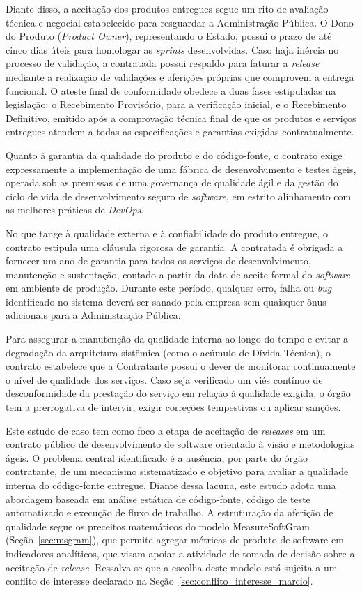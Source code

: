 Diante disso, a aceitação dos produtos entregues segue um rito de avaliação técnica e negocial estabelecido para resguardar a Administração Pública. O Dono do Produto (\textit{Product Owner}), representando o Estado, possui o prazo de até cinco dias úteis para homologar as \textit{sprints} desenvolvidas. Caso haja inércia no processo de validação, a contratada possui respaldo para faturar a \textit{release} mediante a realização de validações e aferições próprias que comprovem a entrega funcional. O ateste final de conformidade obedece a duas fases estipuladas na legislação: o Recebimento Provisório, para a verificação inicial, e o Recebimento Definitivo, emitido após a comprovação técnica final de que os produtos e serviços entregues atendem a todas as especificações e garantias exigidas contratualmente.

Quanto à garantia da qualidade do produto e do código-fonte, o contrato exige expressamente a implementação de uma fábrica de desenvolvimento e testes ágeis, operada sob as premissas de uma governança de qualidade ágil e da gestão do ciclo de vida de desenvolvimento seguro de \textit{software}, em estrito alinhamento com as melhores práticas de \textit{DevOps}.

No que tange à qualidade externa e à confiabilidade do produto entregue, o contrato estipula uma cláusula rigorosa de garantia. A contratada é obrigada a fornecer um ano de garantia para todos os serviços de desenvolvimento, manutenção e sustentação, contado a partir da data de aceite formal do \textit{software} em ambiente de produção. Durante este período, qualquer erro, falha ou \textit{bug} identificado no sistema deverá ser sanado pela empresa sem quaisquer ônus adicionais para a Administração Pública. 

Para assegurar a manutenção da qualidade interna ao longo do tempo e evitar a degradação da arquitetura sistêmica (como o acúmulo de Dívida Técnica), o contrato estabelece que a Contratante possui o dever de monitorar continuamente o nível de qualidade dos serviços. Caso seja verificado um viés contínuo de desconformidade da prestação do serviço em relação à qualidade exigida, o órgão tem a prerrogativa de intervir, exigir correções tempestivas ou aplicar sanções. 


Este estudo de caso tem como foco a etapa de aceitação de \textit{releases} em um contrato público de desenvolvimento de software orientado à visão e metodologias ágeis. O problema central identificado é a ausência, por parte do órgão contratante, de um mecanismo sistematizado e objetivo para avaliar a qualidade interna do código-fonte entregue. Diante dessa lacuna, este estudo adota uma abordagem baseada em análise estática de código-fonte, código de teste automatizado e execução de fluxo de trabalho. A estruturação da aferição de qualidade segue os preceitos matemáticos do modelo MeasureSoftGram (Seção~\ref{sec:msgram}), que permite agregar métricas de produto de software em indicadores analíticos, que visam apoiar a atividade de tomada de decisão sobre a aceitação de \textit{release}. Ressalva-se que a escolha deste modelo está sujeita a um conflito de interesse declarado na Seção~\ref{sec:conflito_interesse_marcio}.



